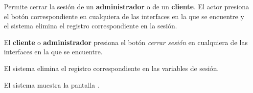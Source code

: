 %
%

{
  Permite cerrar la sesión de un \textbf{administrador} o de un \textbf{cliente}.
  El actor presiona el botón correspondiente en cualquiera de las interfaces en
  la que se encuentre y el sistema elimina el registro correspondiente
  en la sesión.

  \begin{trayectoriaPrincipal}

    \item El \textbf{cliente} o \textbf{administrador} presiona el botón \textit{cerrar sesión}
      en cualquiera de las interfaces en la que se encuentre.

    \item El sistema elimina el registro correspondiente en las variables
      de sesión.

    \item El sistema muestra la pantalla
      .

  \end{trayectoriaPrincipal}
}
